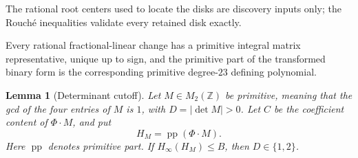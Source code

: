 \documentclass[11pt]{article}
\newtheorem{lemma}[theorem]{Lemma}
\begin{document}
The rational root centers used to locate the disks are discovery inputs only; the Rouch\'e inequalities validate every retained disk exactly.

Every rational fractional-linear change has a primitive integral matrix representative, unique up to sign, and the primitive part of the transformed binary form is the corresponding primitive degree-$23$ defining polynomial.

\begin{lemma}[Determinant cutoff]\label{lem:pgl2-det-cutoff}
Let $M\in M_2(\mathbb Z)$ be primitive, meaning that the gcd of the four entries of $M$ is $1$, with $D=|\det M|>0$.  Let $C$ be the coefficient content of $\Phi\mathbin{\cdot}M$, and put
\[
 H_M=\operatorname{pp}(\Phi\mathbin{\cdot}M).
\]
Here $\operatorname{pp}$ denotes primitive part.  If $H_\infty(H_M)\le B$, then $D\in\{1,2\}$.
\end{lemma}
\end{document}
